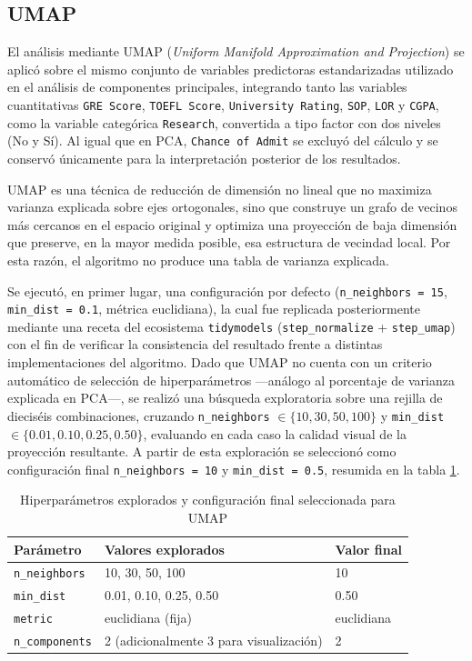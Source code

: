 \documentclass[
  10pt,
  a4paper]{article}
\begin{document}
\subsection{UMAP}\label{umap}

El análisis mediante UMAP (\emph{Uniform Manifold Approximation and Projection}) se aplicó sobre el mismo conjunto de variables predictoras estandarizadas utilizado en el análisis de componentes principales, integrando tanto las variables cuantitativas \texttt{GRE\ Score}, \texttt{TOEFL\ Score}, \texttt{University\ Rating}, \texttt{SOP}, \texttt{LOR} y \texttt{CGPA}, como la variable categórica \texttt{Research}, convertida a tipo factor con dos niveles (No y Sí). Al igual que en PCA, \texttt{Chance\ of\ Admit} se excluyó del cálculo y se conservó únicamente para la interpretación posterior de los resultados.

UMAP es una técnica de reducción de dimensión no lineal que no maximiza varianza explicada sobre ejes ortogonales, sino que construye un grafo de vecinos más cercanos en el espacio original y optimiza una proyección de baja dimensión que preserve, en la mayor medida posible, esa estructura de vecindad local. Por esta razón, el algoritmo no produce una tabla de varianza explicada.

Se ejecutó, en primer lugar, una configuración por defecto (\texttt{n\_neighbors\ =\ 15}, \texttt{min\_dist\ =\ 0.1}, métrica euclidiana), la cual fue replicada posteriormente mediante una receta del ecosistema \texttt{tidymodels} (\texttt{step\_normalize} + \texttt{step\_umap}) con el fin de verificar la consistencia del resultado frente a distintas implementaciones del algoritmo. Dado que UMAP no cuenta con un criterio automático de selección de hiperparámetros ---análogo al porcentaje de varianza explicada en PCA---, se realizó una búsqueda exploratoria sobre una rejilla de dieciséis combinaciones, cruzando \texttt{n\_neighbors} \(\in \{10, 30, 50, 100\}\) y \texttt{min\_dist} \(\in \{0.01, 0.10, 0.25, 0.50\}\), evaluando en cada caso la calidad visual de la proyección resultante. A partir de esta exploración se seleccionó como configuración final \texttt{n\_neighbors\ =\ 10} y \texttt{min\_dist\ =\ 0.5}, resumida en la tabla \ref{tab:umap_hiperparametros}.

\vspace{0.3cm}

\begin{table}[h]
  \centering
  \caption{Hiperparámetros explorados y configuración final seleccionada para UMAP}
  \begin{tabular}{lll}
    \toprule
    \textbf{Parámetro} & \textbf{Valores explorados} & \textbf{Valor final} \\
    \midrule
    \texttt{n\_neighbors} & 10, 30, 50, 100 & 10 \\
    \texttt{min\_dist} & 0.01, 0.10, 0.25, 0.50 & 0.50 \\
    \texttt{metric} & euclidiana (fija) & euclidiana \\
    \texttt{n\_components} & 2 (adicionalmente 3 para visualización) & 2 \\
    \bottomrule
  \end{tabular}
  \label{tab:umap_hiperparametros}
\end{table}
\end{document}
